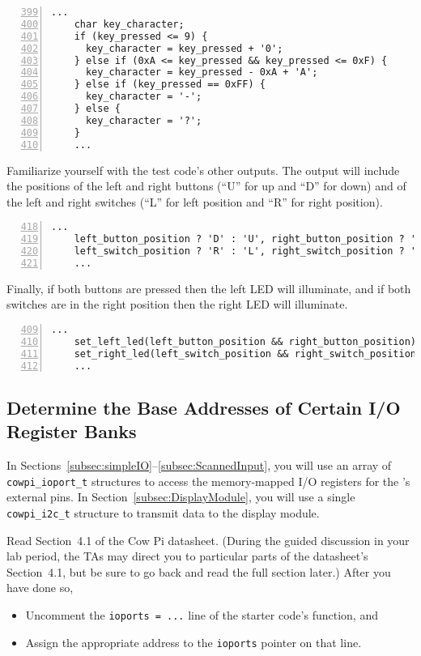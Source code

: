 \begin{lstlisting}[numberstyle=\color{gray}, numbers=left, firstnumber=399]
    ...
    char key_character;
    if (key_pressed <= 9) {
      key_character = key_pressed + '0';
    } else if (0xA <= key_pressed && key_pressed <= 0xF) {
      key_character = key_pressed - 0xA + 'A';
    } else if (key_pressed == 0xFF) {
      key_character = '-';
    } else {
      key_character = '?';
    }
    ...
\end{lstlisting}

Familiarize yourself with the test code's other outputs.
The output will include the positions of the left and right buttons (``U'' for up and ``D'' for down) and of the left and right switches (``L'' for left position and ``R'' for right position).

\begin{lstlisting}[numberstyle=\color{gray}, numbers=left, firstnumber=418]
    ...
    left_button_position ? 'D' : 'U', right_button_position ? 'D' : 'U',
    left_switch_position ? 'R' : 'L', right_switch_position ? 'R' : 'L'
    ...
\end{lstlisting}

Finally, if both buttons are pressed then the left LED will illuminate, and if both switches are in the right position then the right LED will illuminate.

\begin{lstlisting}[numberstyle=\color{gray}, numbers=left, firstnumber=409]
    ...
    set_left_led(left_button_position && right_button_position);
    set_right_led(left_switch_position && right_switch_position);
    ...
\end{lstlisting}


\subsection{Determine the Base Addresses of Certain I/O Register Banks}

In Sections~\ref{subsec:simpleIO}--\ref{subsec:ScannedInput}, you will use an array of \lstinline{cowpi_ioport_t} structures to access the memory-mapped I/O registers for the \developmentboard's external pins.
In Section~\ref{subsec:DisplayModule}, you will use a single \lstinline{cowpi_i2c_t} structure to transmit data to the display module.

Read Section~4.1 of the Cow Pi datasheet.
(During the guided discussion in your lab period, the TAs may direct you to particular parts of the datasheet's Section~4.1,
but be sure to go back and read the full section later.)
After you have done so,
\begin{itemize}
    \item Uncomment the \lstinline{ioports = ...} line of the starter code's  function, and
    \item Assign the appropriate address to the \lstinline{ioports} pointer on that line.
\end{itemize}

